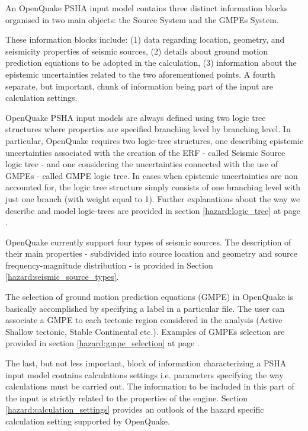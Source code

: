 An OpenQuake PSHA input model contains three distinct information blocks organised in two main objects: the Source System and the GMPEs System. 

These information blocks include: (1) data regarding location, geometry, and seismicity properties of seismic sources, (2) details about ground motion prediction equations to be  adopted in the calculation, (3) information about the epistemic uncertainties related to the two aforementioned points. A fourth separate, but important, chunk of information being part of the input are calculation settings.

OpenQuake PSHA input models are always defined using two logic tree structures where properties are specified branching level by branching level. In particular, OpenQuake requires two logic-tree structures, one describing epistemic uncertainties associated with the creation of the ERF - called Seismic Source logic tree - 
and one considering the uncertainties connected with the use of GMPEs - called GMPE logic tree. 
In cases when epistemic uncertainties are non accounted for, the logic tree structure simply consists of one branching level with just one branch (with weight equal to 1).
%
Further explanations about the way we describe and model logic-trees are provided in section \ref{hazard:logic_tree} at page \pageref{hazard:logic_tree}. 

OpenQuake currently support four types of seismic sources. The description of their main properties - subdivided into source location and geometry and source frequency-magnitude distribution - is provided in Section \ref{hazard:seismic_source_types}. 

The selection of ground motion prediction equations (GMPE) in OpenQuake 
is basically accomplished by specifying a label in a particular file.  
The user can associate a GMPE to each tectonic region considered in the 
analysis (Active Shallow tectonic, Stable Continental etc.). Examples of 
GMPEs selection are provided in section \ref{hazard:gmpe_selection} at page 
\pageref{hazard:gmpe_selection}.

The last, but not less important, block of information characterizing a PSHA 
input model contains calculations settings i.e. parameters specifying the way calculations must be carried out. 
%
The information to be included in this part of the input is strictly related to the properties of the engine. 
%
Section \ref{hazard:calculation_settings} provides an outlook of the hazard specific calculation setting supported by OpenQuake. 
%

%

%
